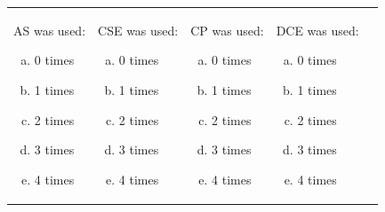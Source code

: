 \documentclass[11pt]{article} %
\begin{document}
\begin{enumerate}
\hspace{10ex}
\begin{tabular}{lllll}
\begin{minipage}{1in}
AS was used:\vspace{-3.5ex}
\newline
\begin{enumerate}[(a)]
\item 0 times
\item 1 times
\item 2 times
\item 3 times
\item 4 times
\end{enumerate}
\end{minipage}
&
\begin{minipage}{1in}
CSE was used:\vspace{-3.5ex}
\newline
\begin{enumerate}[(a)]
\item 0 times
\item 1 times
\item 2 times
\item 3 times
\item 4 times
\end{enumerate}
\end{minipage}
&
\begin{minipage}{1in}
CP was used:\vspace{-3.5ex}
\newline
\begin{enumerate}[(a)]
\item 0 times
\item 1 times
\item 2 times
\item 3 times
\item 4 times
\end{enumerate}
\end{minipage}
&
\begin{minipage}{1in}
DCE was used:\vspace{-3.5ex}
\newline
\begin{enumerate}[(a)]
\item 0 times
\item 1 times
\item 2 times
\item 3 times
\item 4 times
\end{enumerate}
\end{minipage}

\end{tabular}
\end{enumerate}
\end{document}

